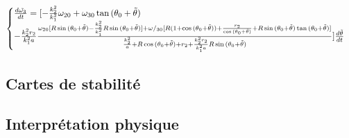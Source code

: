 \begin{equation}
\begin{cases}
    \frac{d\Tilde{\omega_3}}{dt}=[-\frac{k_2^2}{k_1^2}\omega_{20}+\omega_{30}\tan{(\theta_0+\Tilde{\theta})}\\
    -\frac{k_2^2 r_2}{k_1^2 a}\frac{\omega_{20}[R\sin{(\theta_0+\Tilde{\theta})}-\frac{k_2^2}{k_1^2}R\sin{(\theta_0+\Tilde{\theta})}]+\omega/_{30}[R(1+\cos{(\theta_0+\Tilde{\theta})})+\frac{r_2}{\cos{(\theta_0+\Tilde{\theta})}}+R\sin{(\theta_0+\Tilde{\theta})}\tan{(\theta_0+\Tilde{\theta})}]}{\frac{k_2^2}{a}+R\cos{(\theta_0+\Tilde{\theta})}+r_2+\frac{k_2^2 r_2}{k_1^2 a}R\sin{(\theta_0+\Tilde{\theta})}}]\frac{d\Tilde{\theta}}{dt}
  \end{cases}
  \label{eq:b23}
\end{equation}


\subsection{Cartes de stabilité}

\subsection{Interprétation physique}








































